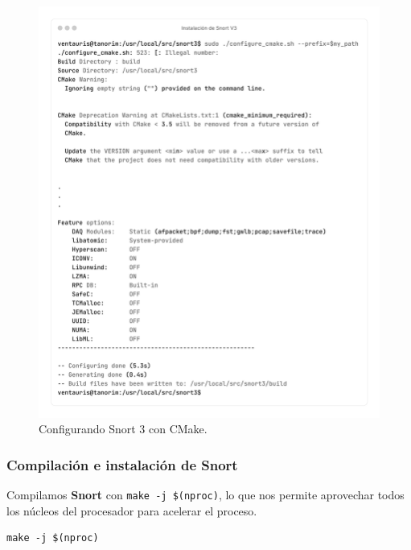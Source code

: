 \documentclass[11pt,a4paper,twoside]{report}
\begin{document}
\begin{figure}[H]
	\centering
	\includegraphics[scale=0.12]{instalacion_snort/21-21.png}
	\caption{Configurando Snort 3 con CMake.}
\end{figure}

\newpage

\subsubsection*{Compilación e instalación de Snort}

Compilamos \textbf{Snort} con \texttt{make -j \$(nproc)}, lo que nos permite aprovechar todos los núcleos del procesador para acelerar el proceso.

\begin{lstlisting}[style=commandstyle, caption={Compilando Snort utilizando todos los núcleos del procesador}]
	make -j $(nproc)
\end{lstlisting}
\end{document}
